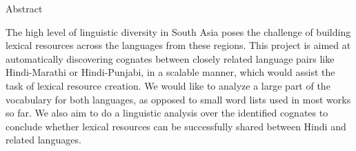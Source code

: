 \begin{center}
\LARGE{Abstract}
\end{center}

\vspace{0.5in}

The high level of linguistic diversity in South Asia poses the challenge of building lexical resources across the languages from these regions. This project is aimed at automatically discovering cognates between closely related language pairs like Hindi-Marathi or Hindi-Punjabi, in a scalable manner, which would assist the task of lexical resource creation. We would like to analyze a large part of the vocabulary for both languages, as opposed to small word lists used in most works so far. We also aim to do a linguistic analysis over the identified cognates to conclude whether lexical resources can be successfully shared between Hindi and related languages.
